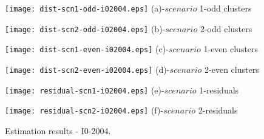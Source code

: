 \begin{figure}
     \begin{minipage}[h]{0.5\linewidth}
        \centering
        \texttt{[image: dist-scn1-odd-i02004.eps]}
				\footnotesize{(a)-$scenario$ 1-odd clusters}
     \end{minipage}
\vspace{3.00mm}
    \begin{minipage}[h]{0.5\linewidth}
       \centering
       \texttt{[image: dist-scn2-odd-i02004.eps]}
			\footnotesize{(b)-$scenario$ 2-odd clusters}
     \end{minipage}
\vspace{3.00mm}
    \begin{minipage}[h]{0.5\linewidth}
       \centering
       \texttt{[image: dist-scn1-even-i02004.eps]}
			\footnotesize{(c)-$scenario$ 1-even clusters}
     \end{minipage}
\vspace{3.00mm}
    \begin{minipage}[h]{0.5\linewidth}
       \centering
       \texttt{[image: dist-scn2-even-i02004.eps]}
			\footnotesize{(d)-$scenario$ 2-even clusters}
     \end{minipage}
\vspace{3.00mm}
    \begin{minipage}[h]{0.5\linewidth}
       \centering
       \texttt{[image: residual-scn1-i02004.eps]}
			\footnotesize{(e)-$scenario$ 1-residuals}
     \end{minipage}
\vspace{0.00mm}
    \begin{minipage}[h]{0.5\linewidth}
       \centering
       \texttt{[image: residual-scn2-i02004.eps]}
			\footnotesize{(f)-$scenario$ 2-residuals}
     \end{minipage}
		\caption{Estimation results - I0-2004.}
\label{fig5}
\end{figure}


